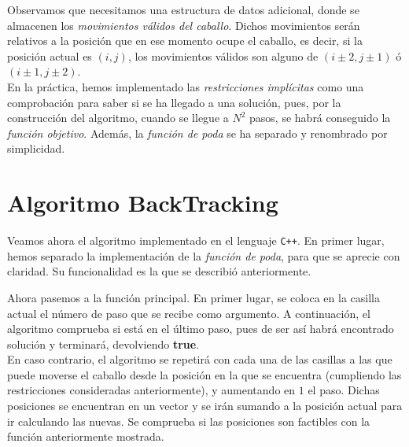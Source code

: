 \documentclass[11pt]{article}
\begin{document}
Observamos que necesitamos una estructura de datos adicional, donde se almacenen los \textit{movimientos válidos del caballo}. Dichos movimientos serán relativos a la posición que en ese momento ocupe el caballo, es decir, si la posición actual es $(i,j)$, los movimientos válidos son alguno de $(i \pm 2, j \pm 1)$ ó $(i \pm 1, j \pm 2)$.\\

En la práctica, hemos implementado las \textit{restricciones implícitas} como una comprobación para saber si se ha llegado a una solución, pues, por la construcción del algoritmo, cuando se llegue a $N^2$ pasos, se habrá conseguido la \textit{función objetivo}. Además, la \textit{función de poda} se ha separado y renombrado por simplicidad.

\section*{Algoritmo BackTracking}

Veamos ahora el algoritmo implementado en el lenguaje \verb|C++|. En primer lugar, hemos separado la implementación de la \textit{función de poda}, para que se aprecie con claridad. Su funcionalidad es la que se describió anteriormente.

	
\vspace{1em}

Ahora pasemos a la función principal. En primer lugar, se coloca en la casilla actual el número de paso que se recibe como argumento. A continuación, el algoritmo comprueba si está en el último paso, pues de ser así habrá encontrado solución y terminará, devolviendo \textbf{true}.\\

En caso contrario, el algoritmo se repetirá con cada una de las casillas a las que puede moverse el caballo desde la posición en la que se encuentra (cumpliendo las restricciones consideradas anteriormente), y aumentando en $1$ el paso. Dichas posiciones se encuentran en un vector y se irán sumando a la posición actual para ir calculando las nuevas. Se comprueba si las posiciones son factibles con la función anteriormente mostrada.\\

	
	\vspace{1em}
\end{document}
